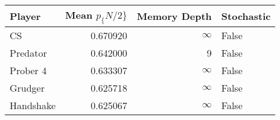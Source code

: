 \begin{tabular}{lrrl}
\toprule
    Player &  Mean $p_\{N/2\}$ &  Memory Depth & Stochastic \\
\midrule
        CS &        0.670920 &            \(\infty\) &      False \\
  Predator &        0.642000 &             9 &      False \\
  Prober 4 &        0.633307 &            \(\infty\) &      False \\
   Grudger &        0.625718 &            \(\infty\) &      False \\
 Handshake &        0.625067 &            \(\infty\) &      False \\
\bottomrule
\end{tabular}
